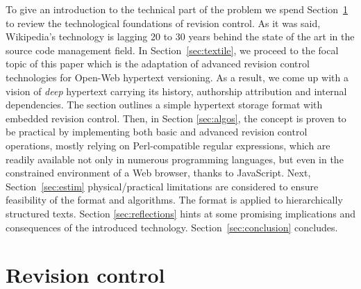 \documentclass{sig-alternate}
\begin{document}
To give an introduction to the technical part of the problem we spend Section~\ref{sec:scm} to review the technological foundations of revision control. As it was said, Wikipedia's technology is lagging 20 to 30 years behind the state of the art in the source code management field. 
In Section~\ref{sec:textile}, we proceed to the focal topic of this paper which is the adaptation of advanced revision control technologies for Open-Web hypertext versioning. As a result, we come up with a vision of \emph{deep} hypertext carrying its history, authorship attribution and internal dependencies.
The section outlines a simple hypertext storage format with embedded revision control.
Then, in Section \ref{sec:algos}, the concept is proven to be practical by implementing both basic and advanced revision control operations, mostly relying on Perl-compatible regular expressions, which are readily available not only in numerous programming languages, but even in the constrained environment of a Web browser, thanks to JavaScript.
Next, Section~\ref{sec:estim} physical/practical limitations are considered to ensure feasibility of the format and algorithms.
The format is applied to hierarchically structured texts.
Section \ref{sec:reflections} hints at some promising implications and consequences of the introduced technology.
Section~\ref{sec:conclusion} concludes.



\section{Revision control} \label{sec:scm}
\end{document}
